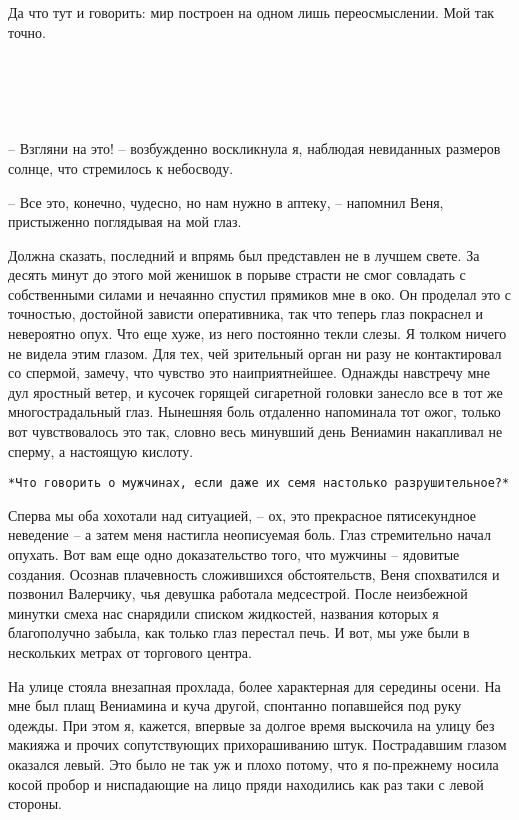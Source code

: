 \documentclass[
]{book}
\begin{document}
Да что тут и говорить: мир построен на одном лишь переосмыслении. Мой так точно.

\hypertarget{chapter-28}{%
\chapter{~}\label{chapter-28}}

-- Взгляни на это! -- возбужденно воскликнула я, наблюдая невиданных размеров солнце, что стремилось к небосводу.

-- Все это, конечно, чудесно, но нам нужно в аптеку, -- напомнил Веня, пристыженно поглядывая на мой глаз.

Должна сказать, последний и впрямь был представлен не в лучшем свете. За десять минут до этого мой женишок в порыве страсти не смог совладать с собственными силами и нечаянно спустил прямиков мне в око. Он проделал это с точностью, достойной зависти оперативника, так что теперь глаз покраснел и невероятно опух. Что еще хуже, из него постоянно текли слезы. Я толком ничего не видела этим глазом. Для тех, чей зрительный орган ни разу не контактировал со спермой, замечу, что чувство это наиприятнейшее. Однажды навстречу мне дул яростный ветер, и кусочек горящей сигаретной головки занесло все в тот же многострадальный глаз. Нынешняя боль отдаленно напоминала тот ожог, только вот чувствовалось это так, словно весь минувший день Вениамин накапливал не сперму, а настоящую кислоту.

\begin{verbatim}
*Что говорить о мужчинах, если даже их семя настолько разрушительное?*
\end{verbatim}

Сперва мы оба хохотали над ситуацией, -- ох, это прекрасное пятисекундное неведение -- а затем меня настигла неописуемая боль. Глаз стремительно начал опухать. Вот вам еще одно доказательство того, что мужчины -- ядовитые создания. Осознав плачевность сложившихся обстоятельств, Веня спохватился и позвонил Валерчику, чья девушка работала медсестрой. После неизбежной минутки смеха нас снарядили списком жидкостей, названия которых я благополучно забыла, как только глаз перестал печь. И вот, мы уже были в нескольких метрах от торгового центра.

На улице стояла внезапная прохлада, более характерная для середины осени. На мне был плащ Вениамина и куча другой, спонтанно попавшейся под руку одежды. При этом я, кажется, впервые за долгое время выскочила на улицу без макияжа и прочих сопутствующих прихорашиванию штук. Пострадавшим глазом оказался левый. Это было не так уж и плохо потому, что я по-прежнему носила косой пробор и ниспадающие на лицо пряди находились как раз таки с левой стороны.
\end{document}
